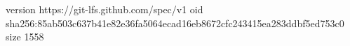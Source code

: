 version https://git-lfs.github.com/spec/v1
oid sha256:85ab503c637b41e82e36fa5064ecad16eb8672cfc243415ea283ddbf5ed753c0
size 1558
